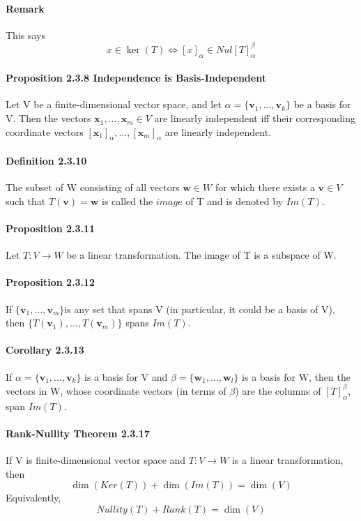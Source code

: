\documentclass[11pt]{article}
\newcommand{\tb}[1]{\textbf{#1}}
\newcommand{\litran}[0]{$T: V \rightarrow W$ }
\begin{document}
{\paragraph{Remark} This says $$x \in \ker(T) \iff [x]_\alpha \in Nul[T]_\alpha^\beta$$
\paragraph{Proposition 2.3.8 Independence is Basis-Independent} Let V be a finite-dimensional vector space, and let $\alpha = \{\tb{v}_1, ..., \tb{v}_k \}$ be a basis for V. Then the vectors $\tb{x}_1,...,\tb{x}_m \in V$ are linearly independent iff their corresponding coordinate vectors $[\tb{x}_1]_\alpha, ..., [\tb{x}_m]_\alpha$ are linearly independent.
\paragraph{Definition 2.3.10} The subset of W consisting of all vectors $\tb{w} \in W$ for which there exists a $\tb{v} \in V$ such that $T(\tb{v}) = \tb{w}$ is called the $image$ of T and is denoted by $Im(T).$

\paragraph{Proposition 2.3.11} Let \litran be a linear transformation. The image of T is a subspace of W.

\paragraph{Proposition 2.3.12} If $\{ \tb{v}_1, ..., \tb{v}_m\}$is any set that spans V (in particular, it could be a basis of V), then $\{T(\tb{v}_1),...,T(\tb{v}_m)\}$ spans $Im(T)$.
\paragraph{Corollary 2.3.13} If $\alpha = \{ \tb{v}_1, ..., \tb{v}_k\}$ is a basis for V and $\beta = \{ \tb{w}_1, ..., \tb{w}_l\}$ is a basis for W, then the vectors in W, whose coordinate vectors (in terms of $\beta$) are the columns of $[T]_\alpha^\beta$, span $Im(T)$.
\paragraph{Rank-Nullity Theorem 2.3.17} If V is finite-dimensional vector space and \litran is a linear transformation, then
$$\dim(Ker(T)) + \dim(Im(T)) = \dim(V)$$
Equivalently, 
$$Nullity(T) + Rank(T) = \dim(V)$$


}
\end{document}
